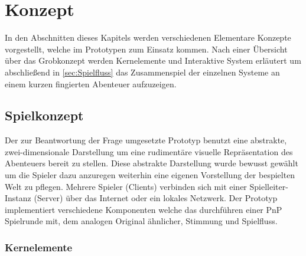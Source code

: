 \chapter{Konzept}
\label{concept}
In den Abschnitten dieses Kapitels werden verschiedenen Elementare Konzepte vorgestellt, welche im Prototypen zum Einsatz kommen. Nach einer Übersicht über das Grobkonzept werden Kernelemente und Interaktive System erläutert um abschließend in \ref{sec:Spielfluss} das Zusammenspiel der einzelnen Systeme an einem kurzen fingierten Abenteuer aufzuzeigen.

\section{Spielkonzept}
\label{sec:Grobkonzept}
Der zur Beantwortung der Frage umgesetzte Prototyp benutzt eine abstrakte, zwei-dimensionale Darstellung um eine rudimentäre visuelle Repräsentation des Abenteuers bereit zu stellen. Diese abstrakte Darstellung wurde bewusst gewählt um die Spieler dazu anzuregen weiterhin eine eigenen Vorstellung der bespielten Welt zu pflegen. Mehrere Spieler (Clients) verbinden sich mit einer Spielleiter-Instanz (Server) über das Internet oder ein lokales Netzwerk. Der Prototyp implementiert verschiedene Komponenten welche das durchführen einer PnP Spielrunde mit, dem analogen Original ähnlicher, Stimmung und Spielfluss.



\subsection{Kernelemente}

